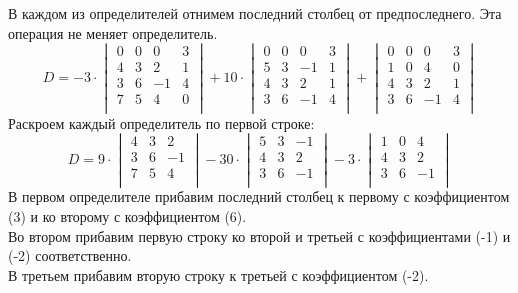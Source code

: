 	    В каждом из определителей отнимем последний столбец от предпоследнего. Эта операция не меняет определитель.
	    \[
	    D =
	    -3 \cdot
	    \begin{vmatrix}
	    0 & 0 & 0 & 3 \\
	    4 & 3 & 2 & 1 \\
	    3 & 6 & -1 & 4 \\
	    7 & 5 & 4 & 0 \\
	    \end{vmatrix} 
	    + 10 \cdot 
	    \begin{vmatrix}
	    0 & 0 & 0 & 3 \\
	    5 & 3 & -1 & 1 \\
	    4 & 3 & 2 & 1 \\
	    3 & 6 & -1 & 4 \\
	    \end{vmatrix}
	    +
	    \begin{vmatrix}
	    0 & 0 & 0 & 3 \\
	    1 & 0 & 4 & 0 \\
	    4 & 3 & 2 & 1 \\
	    3 & 6 & -1 & 4 \\
	    \end{vmatrix}
	    \]
	    Раскроем каждый определитель по первой строке:
	    \[
	    D =
	    9 \cdot
	    \begin{vmatrix}
	    4 & 3 & 2 \\
	    3 & 6 & -1 \\
	    7 & 5 & 4 \\
	    \end{vmatrix} 
	    - 30 \cdot 
	    \begin{vmatrix}
	    5 & 3 & -1 \\
	    4 & 3 & 2 \\
	    3 & 6 & -1 \\
	    \end{vmatrix}
	    -3 \cdot
	    \begin{vmatrix}
	    1 & 0 & 4 \\
	    4 & 3 & 2 \\
	    3 & 6 & -1 \\
	    \end{vmatrix}
	    \]
	    В первом определителе прибавим последний столбец к первому с коэффициентом (3) и ко второму с коэффициентом (6).\\
	    Во втором прибавим первую строку ко второй и третьей с коэффициентами (-1) и (-2) соответственно.\\
	    В третьем прибавим вторую строку к третьей с коэффициентом (-2). 
